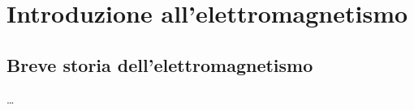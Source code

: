\documentclass[letterpaper,10pt,italian]{jupyterBook}
\begin{document}
\chapter{Introduzione all’elettromagnetismo}
\label{\detokenize{ch/electromagnetism/intro:introduzione-all-elettromagnetismo}}\label{\detokenize{ch/electromagnetism/intro:physics-hs-electromagnetism-intro}}\label{\detokenize{ch/electromagnetism/intro::doc}}
\sphinxstepscope


\section{Breve storia dell’elettromagnetismo}
\label{\detokenize{ch/electromagnetism/intro-history:breve-storia-dell-elettromagnetismo}}\label{\detokenize{ch/electromagnetism/intro-history:physics-hs-electromagnetism-intro-history}}\label{\detokenize{ch/electromagnetism/intro-history::doc}}
\sphinxAtStartPar
{}
…
\end{document}
